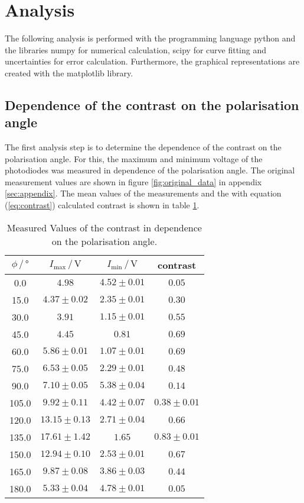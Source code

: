 \section{Analysis}
\label{sec:Analysis}

The following analysis is performed with the programming language python \cite{python} and the libraries numpy \cite{numpy} for numerical calculation, scipy \cite{scipy} for curve fitting and uncertainties \cite{uncertainties} for error calculation.
Furthermore, the graphical representations are created with the matplotlib \cite{matplotlib} library.

\subsection{Dependence of the contrast on the polarisation angle}
\label{subsec:polarisation}

The first analysis step is to determine the dependence of the contrast on the polarisation angle.
For this, the maximum and minimum voltage of the photodiodes was measured in dependence of the polarisation angle.
The original measurement values are shown in figure \ref{fig:original_data} in appendix \ref{sec:appendix}.
The mean values of the measurements and the with equation (\ref{eq:contrast}) calculated contrast is shown in table \ref{tab:values_polarisation}.

\begin{table}[H]
    \centering
    \caption{Measured Values of the contrast in dependence on the polarisation angle.}
    \label{tab:values_polarisation}
    \begin{tabular}{c c c c}
        \toprule
        $\phi \,/\, \si{\degree}$ & $I_{\text{max}}\,/\,\si{\volt}$ & $I_{\text{min}}\,/\,\si{\volt}$ & contrast \\
        \midrule
        0.0 & $4.98$ & $4.52\pm0.01$ & $0.05$ \\
        15.0 & $4.37\pm0.02$ & $2.35\pm0.01$ & $0.30$ \\
        30.0 & $3.91$ & $1.15\pm0.01$ & $0.55$ \\
        45.0 & $4.45$ & $0.81$ & $0.69$ \\
        60.0 & $5.86\pm0.01$ & $1.07\pm0.01$ & $0.69$ \\
        75.0 & $6.53\pm0.05$ & $2.29\pm0.01$ & $0.48$ \\
        90.0 & $7.10\pm0.05$ & $5.38\pm0.04$ & $0.14$ \\
        105.0 & $9.92\pm0.11$ & $4.42\pm0.07$ & $0.38\pm0.01$ \\
        120.0 & $13.15\pm0.13$ & $2.71\pm0.04$ & $0.66$ \\
        135.0 & $17.61\pm1.42$ & $1.65$ & $0.83\pm0.01$ \\
        150.0 & $12.94\pm0.10$ & $2.53\pm0.01$ & $0.67$ \\
        165.0 & $9.87\pm0.08$ & $3.86\pm0.03$ & $0.44$ \\
        180.0 & $5.33\pm0.04$ & $4.78\pm0.01$ & $0.05$ \\
        \bottomrule
    \end{tabular}
\end{table}


